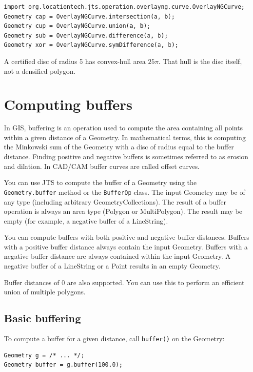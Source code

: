 \documentclass[11pt]{article}
\begin{document}
\begin{lstlisting}
import org.locationtech.jts.operation.overlayng.curve.OverlayNGCurve;
Geometry cap = OverlayNGCurve.intersection(a, b);
Geometry cup = OverlayNGCurve.union(a, b);
Geometry sub = OverlayNGCurve.difference(a, b);
Geometry xor = OverlayNGCurve.symDifference(a, b);
\end{lstlisting}

A certified disc of radius 5 has convex-hull area $25\pi$. That hull
is the disc itself, not a densified polygon.


\section{Computing buffers}
\label{sec:buffers}
In GIS, buffering is an operation used to compute the area containing
all points within a given distance of a Geometry. In mathematical
terms, this is computing the Minkowski sum of the Geometry with a
disc of radius equal to the buffer distance. Finding positive and
negative buffers is sometimes referred to as erosion and dilation. In
CAD/CAM buffer curves are called offset curves.

You can use JTS to compute the buffer of a Geometry using the
\texttt{Geometry.buffer} method or the \texttt{BufferOp} class. The
input Geometry may be of any type (including arbitrary
GeometryCollections). The result of a buffer operation is always an
area type (Polygon or MultiPolygon). The result may be empty (for
example, a negative buffer of a LineString).

You can compute buffers with both positive and negative buffer
distances. Buffers with a positive buffer distance always contain the
input Geometry. Buffers with a negative buffer distance are always
contained within the input Geometry. A negative buffer of a
LineString or a Point results in an empty Geometry.

Buffer distances of 0 are also supported. You can use this to perform
an efficient union of multiple polygons.

\subsection{Basic buffering}
To compute a buffer for a given distance, call \texttt{buffer()} on
the Geometry:

\begin{lstlisting}
Geometry g = /* ... */;
Geometry buffer = g.buffer(100.0);
\end{lstlisting}
\end{document}
